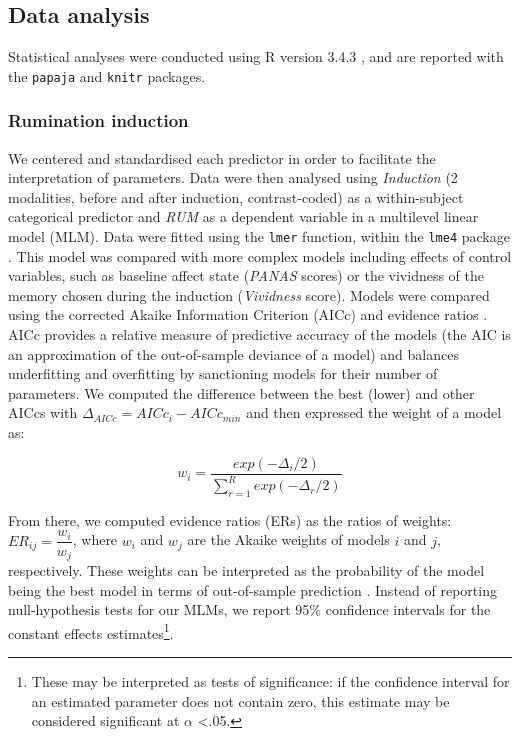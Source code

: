 \documentclass[12pt,]{book}
\let\rmarkdownfootnote\footnote%
\def\footnote{\protect\rmarkdownfootnote}
\begin{document}
\subsection{Data analysis}\label{data-analysis}

Statistical analyses were conducted using R version 3.4.3
\citep{R-base}, and are reported with the \texttt{papaja}
\citep{R-papaja} and \texttt{knitr} \citep{R-knitr} packages.

\subsubsection{Rumination induction}\label{rumination-induction-1}

We centered and standardised each predictor in order to facilitate the
interpretation of parameters. Data were then analysed using
\emph{Induction} (2 modalities, before and after induction,
contrast-coded) as a within-subject categorical predictor and \emph{RUM}
as a dependent variable in a multilevel linear model (MLM). Data were
fitted using the \texttt{lmer} function, within the \texttt{lme4}
package \citep{lme4}. This model was compared with more complex models
including effects of control variables, such as baseline affect state
(\emph{PANAS} scores) or the vividness of the memory chosen during the
induction (\emph{Vividness} score). Models were compared using the
corrected Akaike Information Criterion (AICc) and evidence ratios
\citep{Burnham2002, Burnham2011, Hegyi2011}. AICc provides a relative
measure of predictive accuracy of the models (the AIC is an
approximation of the out-of-sample deviance of a model) and balances
underfitting and overfitting by sanctioning models for their number of
parameters. We computed the difference between the best (lower) and
other AICcs with \(\Delta_{AICc}=AICc_{i}-AICc_{min}\) and then
expressed the weight of a model as:

\[w_{i}=\dfrac{exp(-\Delta_{i}/2)}{\sum_{r=1}^{R}exp(-\Delta_{r}/2)}\]

From there, we computed evidence ratios (ERs) as the ratios of weights:
\(ER_{ij} = \dfrac{w_{i}}{w_{j}}\), where \(w_{i}\) and \(w_{j}\) are
the Akaike weights of models \(i\) and \(j\), respectively. These
weights can be interpreted as the probability of the model being the
best model in terms of out-of-sample prediction \citep{Burnham2002}.
Instead of reporting null-hypothesis tests for our MLMs, we report 95\%
confidence intervals for the constant effects estimates\footnote{These
  may be interpreted as tests of significance: if the confidence
  interval for an estimated parameter does not contain zero, this
  estimate may be considered significant at \(\alpha\) \textless{}.05.}.
\end{document}
